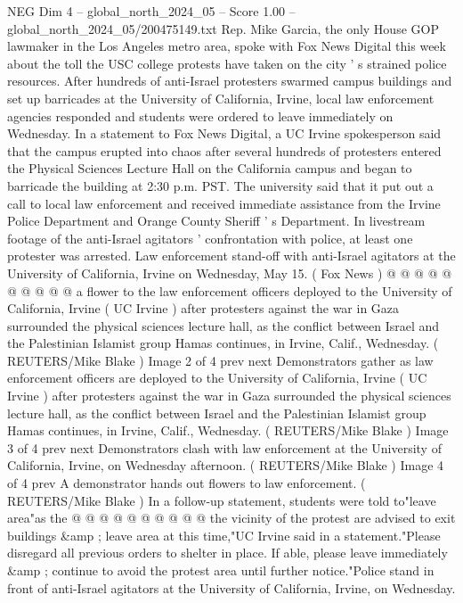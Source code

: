 \begin{textsample}{NEG Dim 4 – global\_north\_2024\_05 – Score 1.00 – global\_north\_2024\_05/200475149.txt}  \label{ex:f4_neg_117}
Rep.
Mike Garcia, the only House GOP lawmaker in the Los Angeles metro area, spoke with Fox News Digital this week about the toll the USC college protests have taken on the city ' s strained police resources.
After hundreds of anti-Israel protesters swarmed campus buildings and set up barricades at the University of California, Irvine, local law enforcement agencies responded and students were ordered to leave immediately on Wednesday.
In a statement to Fox News Digital, a UC Irvine spokesperson said that the campus erupted into chaos after several hundreds of protesters entered the Physical Sciences Lecture Hall on the California campus and began to barricade the building at 2:30 p.m.
PST.
The university said that it put out a call to local law enforcement and received immediate assistance from the Irvine Police Department and Orange County Sheriff ' s Department.
In livestream footage of the anti-Israel agitators ' confrontation with police, at least one protester was arrested.
Law enforcement stand-off with anti-Israel agitators at the University of California, Irvine on Wednesday, May 15. ( Fox News ) @ @ @ @ @ @ @ @ @ @ a flower to the law enforcement officers deployed to the University of California, Irvine ( UC Irvine ) after protesters against the war in Gaza surrounded the physical sciences lecture hall, as the conflict between Israel and the Palestinian Islamist group Hamas continues, in Irvine, Calif., Wednesday. ( REUTERS/Mike Blake ) Image 2 of 4 prev next Demonstrators gather as law enforcement officers are deployed to the University of California, Irvine ( UC Irvine ) after protesters against the war in Gaza surrounded the physical sciences lecture hall, as the conflict between Israel and the Palestinian Islamist group Hamas continues, in Irvine, Calif., Wednesday. ( REUTERS/Mike Blake ) Image 3 of 4 prev next Demonstrators clash with law enforcement at the University of California, Irvine, on Wednesday afternoon. ( REUTERS/Mike Blake ) Image 4 of 4 prev A demonstrator hands out flowers to law enforcement. ( REUTERS/Mike Blake ) In a follow-up statement, students were told to"leave area"as the @ @ @ @ @ @ @ @ @ @ the vicinity of the protest are advised to exit buildings \&amp ; leave area at this time,"UC Irvine said in a statement."Please disregard all previous orders to shelter in place.
If able, please leave immediately \&amp ; continue to avoid the protest area until further notice."Police stand in front of anti-Israel agitators at the University of California, Irvine, on Wednesday.

\end{textsample}
